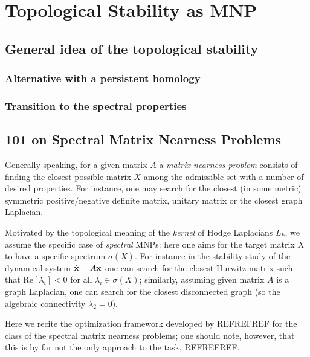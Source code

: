 \chapter{Topological Stability as MNP}

\section{ General idea of the topological stability }

\subsection{Alternative with a persistent homology}


\subsection{ Transition to the spectral properties }





\section{ 101 on Spectral Matrix Nearness Problems }


Generally speaking, for a given matrix \( A \) a \emph{matrix nearness problem} consists of finding the closest possible matrix \( X \) among the admissible set with a number of desired properties. For instance, one may search for the closest (in some metric) symmetric positive/negative definite matrix, unitary matrix or the closest graph Laplacian. 

Motivated by the topological meaning of the \emph{kernel} of Hodge Laplacians \( L_k \), we assume the specific case of \emph{spectral} MNPs: here one aims for the target matrix \( X \) to have a specific spectrum \( \sigma(X) \). For instance in the stability study of the dynamical system \( \dot{\mathbf{x}} = A \mathbf{x} \) one can search for the closest Hurwitz matrix such that \( \mathrm{Re} \left[ \lambda_i \right] < 0 \) for all \( \lambda_i \in \sigma(X) \); similarly, assuming given matrix \( A \) is a graph Laplacian, one can search for the closest disconnected graph (so the algebraic connectivity \( \lambda_2 = 0 \)).

Here we recite the optimization framework developed by REFREFREF for the class of the spectral matrix nearness problems; one should note, however, that this is by far not the only approach to the task, REFREFREF.


